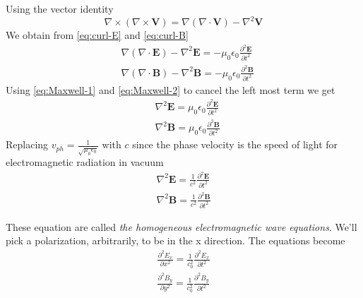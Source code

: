 Using the vector identity
\begin{equation}
    \nabla \times \left ( \nabla \times \mathbf{V} \right) = \nabla \left ( \nabla \cdot \mathbf{V} \right) - \nabla^2 \mathbf{V}
\end{equation}
We obtain from \ref{eq:curl-E} and \ref{eq:curl-B}
\begin{subequations}
    \begin{align}
        &\nabla (\nabla \cdot \textbf{E}) - \nabla^2 \textbf{E} 
        = -\mu_0\epsilon_0\frac{\partial^2 \textbf{E}}{\partial t^2} \\
        &\nabla (\nabla \cdot \textbf{B}) - \nabla^2 \textbf{B} 
        = -\mu_0\epsilon_0\frac{\partial^2 \textbf{B}}{\partial t^2}
    \end{align}
\end{subequations}
Using \ref{eq:Maxwell-1} and \ref{eq:Maxwell-2} to cancel the left most term we get
\begin{subequations}
    \begin{align}
        &\nabla^2 \textbf{E} = \mu_0\epsilon_0\frac{\partial^2 \textbf{E}}{\partial t^2}\\
        &\nabla^2 \textbf{B} = \mu_0\epsilon_0\frac{\partial^2 \textbf{B}}{\partial t^2}
    \end{align}
\end{subequations}
Replacing $v_{ph} = \frac{1}{\sqrt{\mu_0\epsilon_0}}$ with $c$ since the phase velocity is the speed of light for electromagnetic radiation in vacuum
\begin{equation} \label{eq:Homo_electro_wave}
    \begin{split}
        \nabla^2 \textbf{E} = \frac{1}{c^2}\frac{\partial^2 \textbf{E}}{\partial t^2} \\
        \nabla^2 \textbf{B} = \frac{1}{c^2}\frac{\partial^2 \textbf{B}}{\partial t^2}
    \end{split}
\end{equation}

These equation are called \textit{the homogeneous electromagnetic wave equations}.
We'll pick a polarization, arbitrarily, to be in the x direction. The equations become
\begin{equation} \label{eq:Homo_electro_wave_pol}
    \begin{split}
        \frac{\partial^2 E_x}{\partial x^2} = \frac{1}{c_0^2}\frac{\partial^2 E_x}{\partial t^2} \\
        \frac{\partial^2 B_y}{\partial y^2} = \frac{1}{c_0^2}\frac{\partial^2 B_y}{\partial t^2} 
    \end{split}
\end{equation}

